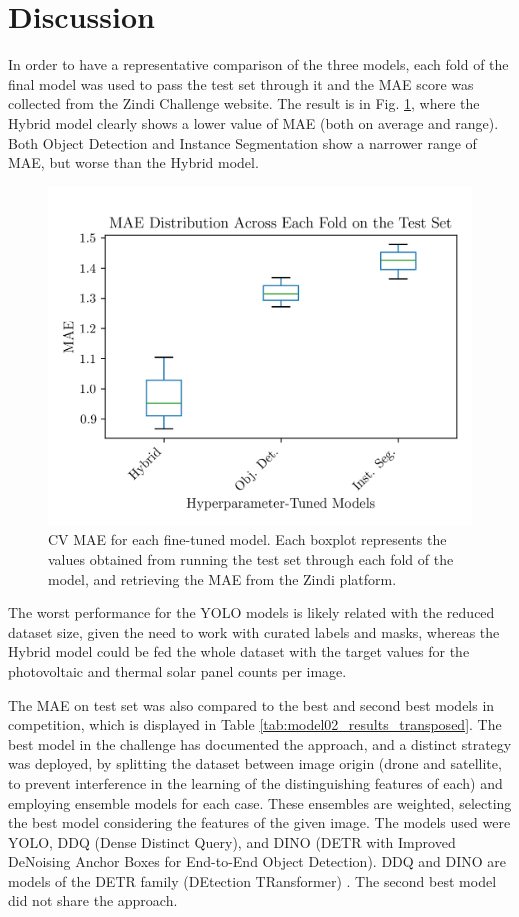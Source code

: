 \documentclass[conference]{IEEEtran}
\begin{document}
\section{Discussion}

In order to have a representative comparison of the three models, each fold of the final model was used to pass the test set through it and the MAE score was collected from the Zindi Challenge website. The result is in Fig. \ref{fig:results_mae_boxplot}, where the Hybrid model clearly shows a lower value of MAE (both on average and range). Both Object Detection and Instance Segmentation show a narrower range of MAE, but worse than the Hybrid model.
\begin{figure}[H]
    \centering
    \includegraphics[width=1\linewidth]{assets/results_mae_boxplot.png}
    \caption{CV MAE for each fine-tuned model. Each boxplot represents the values obtained from running the test set through each fold of the model, and retrieving the MAE from the Zindi platform.}
    \label{fig:results_mae_boxplot}
\end{figure}

The worst performance for the YOLO models is likely related with the reduced dataset size, given the need to work with curated labels and masks, whereas the Hybrid model could be fed the whole dataset with the target values for the photovoltaic and thermal solar panel counts per image.

The MAE on test set was also compared to the best and second best models in competition, which is displayed in Table \ref{tab:model02_results_transposed}. The best model in the challenge has documented the approach, and a distinct strategy was deployed, by splitting the dataset between image origin (drone and satellite, to prevent interference in the learning of the distinguishing features of each) and employing ensemble models for each case. These ensembles are weighted, selecting the best model considering the features of the given image. The models used were YOLO, DDQ (Dense Distinct Query), and DINO (DETR with Improved DeNoising Anchor Boxes for End-to-End Object Detection). DDQ and DINO are models of the DETR family (DEtection TRansformer) \cite{zindi_lacuna_solar_survey}. The second best model did not share the approach.
\end{document}
